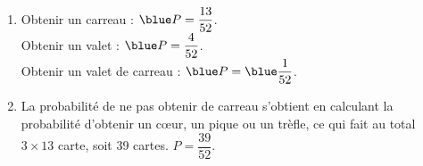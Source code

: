    \ \\ [-5mm]
   \begin{enumerate}
      \item Obtenir un carreau : ${\blue P =\dfrac{13}{52}}$. \\
         Obtenir un valet : ${\blue P =\dfrac{4}{52}}$. \\
         Obtenir un valet de carreau  : ${\blue P =\blue \dfrac{1}{52}}$. \smallskip
      \item La probabilité de ne pas obtenir de carreau s'obtient en calculant la probabilité d'obtenir un c\oe ur, un pique ou un trèfle, ce qui fait au total $3\times13$ carte, soit 39 cartes. {\blue $P =\dfrac{39}{52}$}.
   \end{enumerate}
